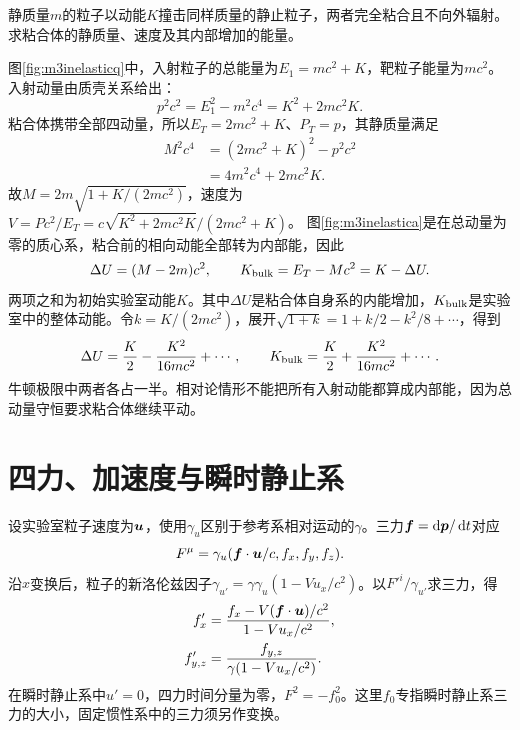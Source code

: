 \begin{example}\label{ex:m3inelastic}
静质量$m$的粒子以动能$K$撞击同样质量的静止粒子，两者完全粘合且不向外辐射。求粘合体的静质量、速度及其内部增加的能量。
\end{example}
\begin{solution}
图\ref{fig:m3inelasticq}中，入射粒子的总能量为$E_1=mc^2+K$，靶粒子能量为$mc^2$。入射动量由质壳关系给出：
\[
 p^2c^2=E_1^2-m^2c^4=K^2+2mc^2K.
\]
粘合体携带全部四动量，所以$E_T=2mc^2+K$、$P_T=p$，其静质量满足
\begin{align*}
 M^2c^4&=(2mc^2+K)^2-p^2c^2\\
 &=4m^2c^4+2mc^2K.
\end{align*}
故$M=2m\sqrt{1+K/(2mc^2)}$，速度为$V=Pc^2/E_T=c\sqrt{K^2+2mc^2K}/(2mc^2+K)$。
图\ref{fig:m3inelastica}是在总动量为零的质心系，粘合前的相向动能全部转为内部能，因此
\[
 \Delta U=(M-2m)c^2,
 \qquad K_{\rm bulk}=E_T-Mc^2=K-\Delta U.
\]
两项之和为初始实验室动能$K$。其中$\Delta U$是粘合体自身系的内能增加，$K_{\rm bulk}$是实验室中的整体动能。令$k=K/(2mc^2)$，展开$\sqrt{1+k}=1+k/2-k^2/8+\cdots$，得到
\[
 \Delta U=\frac K2-\frac{K^2}{16mc^2}+\cdots,\qquad
 K_{\rm bulk}=\frac K2+\frac{K^2}{16mc^2}+\cdots.
\]
牛顿极限中两者各占一半。相对论情形不能把所有入射动能都算成内部能，因为总动量守恒要求粘合体继续平动。
\end{solution}

\section{四力、加速度与瞬时静止系}\label{th:m3force}
设实验室粒子速度为$\bm{u}$，使用$\gamma_u$区别于参考系相对运动的$\gamma$。三力$\bm{f}=\mathop{}\!\mathrm d\bm{p}/\mathop{}\!\mathrm d t$对应
\[
 F^\mu=\gamma_u(\bm{f}\cdot\bm{u}/c,f_x,f_y,f_z).
\]
沿$x$变换后，粒子的新洛伦兹因子$\gamma_{u'}=\gamma\gamma_u(1-Vu_x/c^2)$。以$F'^i/\gamma_{u'}$求三力，得
\begin{align}\label{eq:m3forcetrans}
 f'_x&=\frac{f_x-V(\bm{f}\cdot\bm{u})/c^2}{1-Vu_x/c^2},\\
 f'_{y,z}&=\frac{f_{y,z}}{\gamma(1-Vu_x/c^2)}.\notag
\end{align}
在瞬时静止系中$u'=0$，四力时间分量为零，$F^2=-f_0^2$。这里$f_0$专指瞬时静止系三力的大小，固定惯性系中的三力须另作变换。

